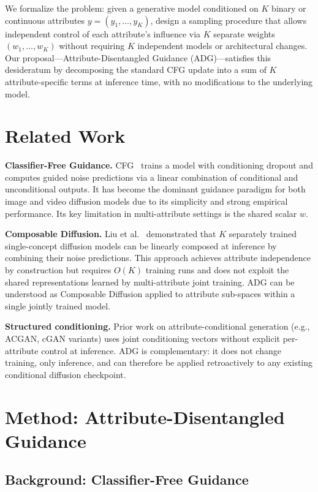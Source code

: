 \documentclass{article}
\begin{document}
We formalize the problem: given a generative model conditioned on $K$ binary or continuous attributes $y = (y_1, \ldots, y_K)$, design a sampling procedure that allows independent control of each attribute's influence via $K$ separate weights $(w_1, \ldots, w_K)$ without requiring $K$ independent models or architectural changes. Our proposal---Attribute-Disentangled Guidance (ADG)---satisfies this desideratum by decomposing the standard CFG update into a sum of $K$ attribute-specific terms at inference time, with no modifications to the underlying model.

\section{Related Work}
\label{sec:related}

\textbf{Classifier-Free Guidance.} CFG~\citep{ho2022cfg} trains a model with conditioning dropout and computes guided noise predictions via a linear combination of conditional and unconditional outputs. It has become the dominant guidance paradigm for both image and video diffusion models due to its simplicity and strong empirical performance. Its key limitation in multi-attribute settings is the shared scalar $w$.

\textbf{Composable Diffusion.} Liu et al.~\citep{liu2022composable} demonstrated that $K$ separately trained single-concept diffusion models can be linearly composed at inference by combining their noise predictions. This approach achieves attribute independence by construction but requires $O(K)$ training runs and does not exploit the shared representations learned by multi-attribute joint training. ADG can be understood as Composable Diffusion applied to attribute sub-spaces within a single jointly trained model.

\textbf{Structured conditioning.} Prior work on attribute-conditional generation (e.g., ACGAN, cGAN variants) uses joint conditioning vectors without explicit per-attribute control at inference. ADG is complementary: it does not change training, only inference, and can therefore be applied retroactively to any existing conditional diffusion checkpoint.

\section{Method: Attribute-Disentangled Guidance}
\label{sec:method}

\subsection{Background: Classifier-Free Guidance}
\end{document}
